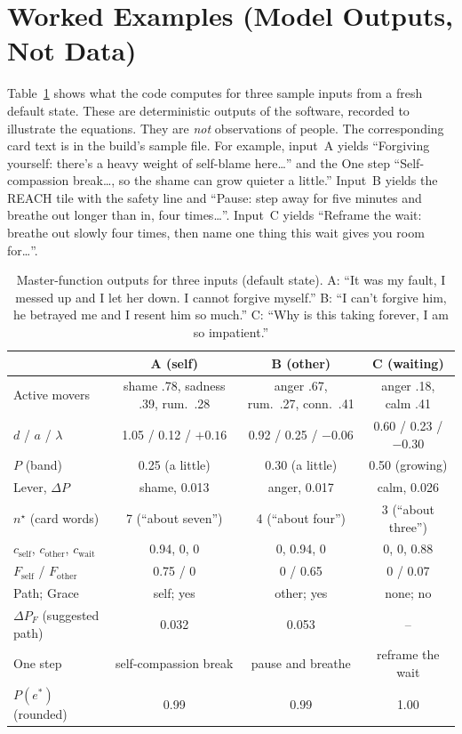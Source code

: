 \documentclass[10pt]{article}
\theoremstyle{definition}
\theoremstyle{remark}
\begin{document}
\section{Worked Examples (Model Outputs, Not Data)}
\label{sec:examples}
Table~\ref{tab:examples} shows what the code computes for three sample inputs from a fresh default state. These are deterministic outputs of the software, recorded to illustrate the equations. They are \emph{not} observations of people. The corresponding card text is in the build's sample file. For example, input~A yields ``Forgiving yourself: there's a heavy weight of self-blame here\dots'' and the One step ``Self-compassion break\dots, so the shame can grow quieter a little.'' Input~B yields the REACH tile with the safety line and ``Pause: step away for five minutes and breathe out longer than in, four times\dots''. Input~C yields ``Reframe the wait: breathe out slowly four times, then name one thing this wait gives you room for\dots''.

\begin{table}[ht]
\centering\small
\caption{Master-function outputs for three inputs (default state). A: ``It was my fault, I messed up and I let her down. I cannot forgive myself.'' B: ``I can't forgive him, he betrayed me and I resent him so much.'' C: ``Why is this taking forever, I am so impatient.''}
\label{tab:examples}
\begin{tabular}{@{}lccc@{}}
\toprule
 & A (self) & B (other) & C (waiting) \\
\midrule
Active movers & shame .78, sadness .39, rum.\ .28 & anger .67, rum.\ .27, conn.\ .41 & anger .18, calm .41 \\
$d$ / $a$ / $\lambda$ & 1.05 / 0.12 / $+0.16$ & 0.92 / 0.25 / $-0.06$ & 0.60 / 0.23 / $-0.30$ \\
$P$ (band) & 0.25 (a little) & 0.30 (a little) & 0.50 (growing) \\
Lever, $\Delta P$ & shame, 0.013 & anger, 0.017 & calm, 0.026 \\
$n^\star$ (card words) & 7 (``about seven'') & 4 (``about four'') & 3 (``about three'') \\
$c_{\mathrm{self}}$, $c_{\mathrm{other}}$, $c_{\mathrm{wait}}$ & 0.94, 0, 0 & 0, 0.94, 0 & 0, 0, 0.88 \\
$F_{\mathrm{self}}$ / $F_{\mathrm{other}}$ & 0.75 / 0 & 0 / 0.65 & 0 / 0.07 \\
Path; Grace & self; yes & other; yes & none; no \\
$\Delta P_F$ (suggested path) & 0.032 & 0.053 & -- \\
One step & self-compassion break & pause and breathe & reframe the wait \\
$P(e^\ast)$ (rounded) & 0.99 & 0.99 & 1.00 \\
\bottomrule
\end{tabular}
\end{table}
\end{document}

